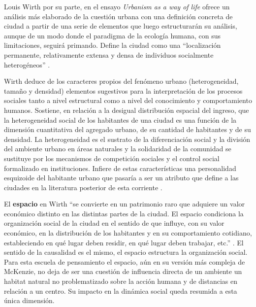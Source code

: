 

Louis Wirth \citeyear{wirth} por su parte, en el ensayo \textit{Urbanism as a way of life} ofrece un análisis más elaborado de la cuestión urbana con una definición concreta de ciudad a partir de una serie de elementos que luego estructurarán su análisis, aunque de un modo donde el paradigma de la ecología humana, con sus limitaciones, seguirá primando. Define la ciudad como una “localización permanente, relativamente extensa y densa de individuos socialmente heterogéneos” \cite[~8]{wirth}. 

Wirth deduce de los caracteres propios del fenómeno urbano (heterogeneidad, tamaño y densidad) elementos sugestivos para la interpretación de los procesos sociales tanto a nivel estructural como a nivel del conocimiento y comportamiento humanos. Sostiene, en relación a la desigual distribución espacial del ingreso, que la heterogeneidad social de los habitantes de una ciudad es una función de la dimensión cuantitativa del agregado urbano, de su cantidad de habitantes y de su densidad. La heterogeneidad es el sustrato de la diferenciación social y la división del ambiente urbano en áreas naturales y la solidaridad de la comunidad se sustituye por los mecanismos de competición sociales y el control social formalizado en instituciones. Infiere de estas características una personalidad esquizoide del habitante urbano que pasaría a ser un atributo que define a las ciudades en la literatura posterior de esta corriente \cite{betin,castells}.

El \textbf{espacio} en Wirth “se convierte en un patrimonio raro que adquiere un valor económico distinto en las distintas partes de la ciudad. El espacio condiciona la organización social de la ciudad en el sentido de que influye, con su valor económico, en la distribución de los habitantes y en su comportamiento cotidiano, estableciendo en qué lugar deben residir, en qué lugar deben trabajar, etc.” \cite[~106]{betin}. El sentido de la causalidad es el mismo, el espacio estructura la organización social. Para esta escuela de pensamiento el espacio, aún en su versión más compleja de McKenzie, no deja de ser una cuestión de influencia directa de un ambiente un habitat natural no problematizado sobre la acción humana y de distancias en relación a un centro. Su impacto en la dinámica social queda resumida a esta única dimensión. 

